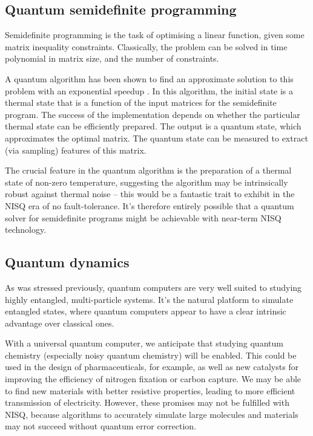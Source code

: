 \subsection{Quantum semidefinite programming}

Semidefinite programming is the task of optimising a linear function, given some matrix inequality constraints. Classically, the problem can be solved in time polynomial in matrix size, and the number of constraints.

A quantum algorithm has been shown to find an approximate solution to this problem with an exponential speedup \cite{bib:brandao2017quantum, bib:brandao2017exponential}. In this algorithm, the initial state is a thermal state that is a function of the input matrices for the semidefinite program. The success of the implementation depends on whether the particular thermal state can be efficiently prepared. The output is a quantum state, which approximates the optimal matrix. The quantum state can be measured to extract (via sampling) features of this matrix. 

The crucial feature in the quantum algorithm is the preparation of a thermal state of non-zero temperature, suggesting the algorithm may be intrinsically robust against thermal noise -- this would be a fantastic trait to exhibit in the NISQ era of no fault-tolerance. It's therefore entirely possible that a quantum solver for semidefinite programs might be achievable with near-term NISQ technology.

\subsection{Quantum dynamics}

As was stressed previously, quantum computers are very well suited to studying highly entangled, multi-particle systems. It's the natural platform to simulate entangled states, where quantum computers appear to have a clear intrinsic advantage over classical ones.
 
With a universal quantum computer, we anticipate that studying quantum chemistry (especially noisy quantum chemistry) will be enabled. This could be used in the design of pharmaceuticals, for example, as well as new catalysts for improving the efficiency of nitrogen fixation or carbon capture. We may be able to find new materials with better resistive properties, leading to  more efficient transmission of electricity. However, these promises may not be fulfilled with NISQ, because algorithms to accurately simulate large molecules and materials may not succeed without quantum error correction.

